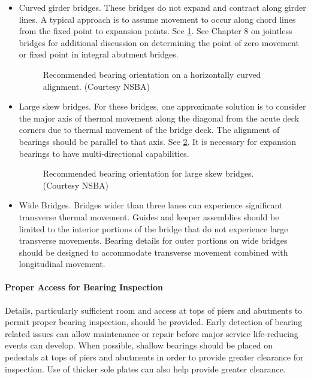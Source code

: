 \begin{itemize}
  \item Curved girder bridges. These bridges do not expand and contract along girder lines. A typical approach is
  to assume movement to occur along chord lines from the fixed point to expansion points. See \cref{fig:bearing-orientation-curved}. See Chapter 8 on jointless bridges for additional discussion on determining the point of zero movement or
  fixed point in integral abutment bridges.

  \begin{figure}
    \caption{Recommended bearing orientation on a horizontally curved alignment. (Courtesy NSBA)}\label{fig:bearing-orientation-curved}
  \end{figure}
  \item Large skew bridges. For these bridges, one approximate solution is to consider the major axis of thermal
  movement along the diagonal from the acute deck corners due to thermal movement of the bridge deck. The
  alignment of bearings should be parallel to that axis. See \cref{fig:bearing-orientation-skew}. It is necessary for expansion
  bearings to have multi-directional capabilities.
  
  \begin{figure}
    \caption{Recommended bearing orientation for large skew bridges. (Courtesy NSBA)}\label{fig:bearing-orientation-skew}
  \end{figure}
  \item Wide Bridges. Bridges wider than three lanes can experience significant transverse thermal movement.
Guides and keeper assemblies should be limited to the interior portions of the bridge that do not experience
large transverse movements. Bearing details for outer portions on wide bridges should be designed to
accommodate transverse movement combined with longitudinal movement.
\end{itemize}

\paragraph{Proper Access for Bearing Inspection}
Details, particularly sufficient room and access at tops of piers and abutments to permit proper bearing
inspection, should be provided. Early detection of bearing related issues can allow maintenance or repair before
major service life-reducing events can develop. When possible, shallow bearings should be placed on pedestals at tops of piers and abutments in order to provide greater clearance for inspection. Use of thicker sole plates can also
help provide greater clearance.

